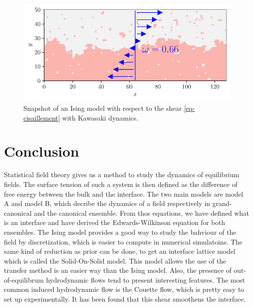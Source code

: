 \begin{figure}
\begin{minipage}[t]{0.5\linewidth}
	\end{minipage}
	\centering
	\begin{minipage}[t]{0.5\linewidth}
		\includegraphics[width=\linewidth]{intro/cis-ising-f-066.pdf}
	\end{minipage}
	\caption{Snapshot of an Ising model with respect to the shear \eqref{eq-cisaillement} with Kawasaki dynamics.}
    \label{snap-ising-shear}	
\end{figure}  


    \section{Conclusion}
{\color{purple}
Statistical field theory gives us a method to study the dynamics of equilibrium fields. The surface tension of such a system is then defined as the difference of free energy between the bulk and the interface. The two main models are model A and model B, which decribe the dynamics of a field respectively in grand-canonical and the canonical ensemble. From thos equations, we have defined what is an interface and have derived the Edwards-Wilkinson equation for both ensembles.
The Ising model provides a good way to study the bahviour of the field by discretization, which is easier to compute in numerical simulatoins. The same kind of reduction as prior can be done, to get an interface lattice model which is called the Solid-On-Solid model. This model allows the use of the transfer method is an easier way than the Ising model. 
Also, the presence of out-of-equilibrum hydrodynamic flows tend to present interesting features. The most common induced hydrodynamic flow is the Couette flow, which is pretty easy to set up experimentally. It has been found that this shear smoothens the interface.
}